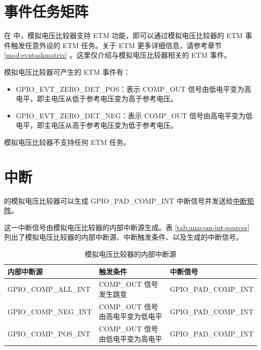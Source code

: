 \documentclass[main\_\_CN.tex]{subfiles}
\begin{document}

\section{事件任务矩阵}
\label{sec:anacom-etm-func}

在 \chipname{} 中，模拟电压比较器支持 ETM 功能，即可以通过模拟电压比较器的 ETM 事件触发任意外设的 ETM 任务。关于 ETM 更多详细信息，请参考章节 \ref{mod:evntaskmatrix} 。这里仅介绍与模拟电压比较器相关的 ETM 事件。

模拟电压比较器可产生的 ETM 事件有：

\begin{itemize}
    \item GPIO\_EVT\_ZERO\_DET\_POS：表示 COMP\_OUT 信号由低电平变为高电平，即主电压从低于参考电压变为高于参考电压。
    \item GPIO\_EVT\_ZERO\_DET\_NEG：表示 COMP\_OUT 信号由高电平变为低电平，即主电压从高于参考电压变为低于参考电压。
\end{itemize}

模拟电压比较器不支持任何 ETM 任务。



\section{中断}

\chipname{} 的模拟电压比较器可以生成 GPIO\_PAD\_COMP\_INT 中断信号并发送给\hyperref[mod:intmtrx]{中断矩阵}。

这一中断信号由模拟电压比较器的内部中断源生成。表 \ref{tab:anacom-int-sources} 列出了模拟电压比较器的内部中断源、中断触发条件、以及生成的中断信号。

\begin{longtable}{ | L{5.5cm} | L{6cm} | L{4cm} | }
\caption{模拟电压比较器的内部中断源} \label{tab:anacom-int-sources}
\\ \hline
{}
\textbf{内部中断源} & \textbf{触发条件}  &  \textbf{中断信号}\\ \hline
\label{int:GPIOCOMPnALLINT}GPIO\_COMP\_ALL\_INT  & COMP\_OUT 信号发生跳变  &  GPIO\_PAD\_COMP\_INT  \\ \hline
\label{int:GPIOCOMPnNEGINT}GPIO\_COMP\_NEG\_INT  & COMP\_OUT 信号由高电平变为低电平   & GPIO\_PAD\_COMP\_INT \\ \hline
\label{int:GPIOCOMPnPOSINT}GPIO\_COMP\_POS\_INT & COMP\_OUT 信号由低电平变为高电平  & GPIO\_PAD\_COMP\_INT \\ \hline
\end{longtable}
\end{document}
